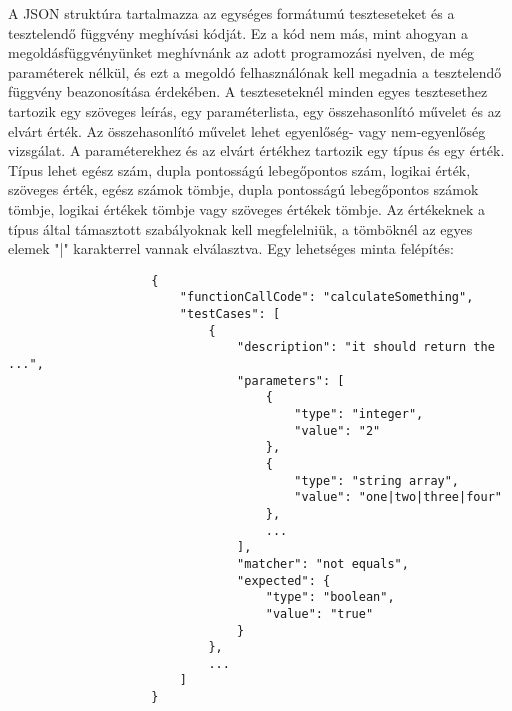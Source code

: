 \documentclass{elteikthesis}
\begin{document}
				A JSON struktúra tartalmazza az egységes formátumú teszteseteket és a tesztelendő függvény meghívási kódját. Ez a kód nem más, mint ahogyan a megoldásfüggvényünket meghívnánk az adott programozási nyelven, de még paraméterek nélkül, és ezt a megoldó felhasználónak kell megadnia a tesztelendő függvény beazonosítása érdekében. A teszteseteknél minden egyes tesztesethez tartozik egy szöveges leírás, egy paraméterlista, egy összehasonlító művelet és az elvárt érték. Az összehasonlító művelet lehet egyenlőség- vagy nem-egyenlőség vizsgálat. A paraméterekhez és az elvárt értékhez tartozik egy típus és egy érték. Típus lehet egész szám, dupla pontosságú lebegőpontos szám, logikai érték, szöveges érték, egész számok tömbje, dupla pontosságú lebegőpontos számok tömbje, logikai értékek tömbje vagy szöveges értékek tömbje. Az értékeknek a típus által támasztott szabályoknak kell megfelelniük, a tömböknél az egyes elemek "|" karakterrel vannak elválasztva. Egy lehetséges minta felépítés:
				\begin{verbatim}
					{
						"functionCallCode": "calculateSomething",
						"testCases": [
							{
								"description": "it should return the ...",
								"parameters": [
									{
										"type": "integer",
										"value": "2"
									},
									{
										"type": "string array",
										"value": "one|two|three|four"
									},
									...
								],
								"matcher": "not equals",
								"expected": {
									"type": "boolean",
									"value": "true"
								}
							},
							...
						]
					}
				\end{verbatim}
\end{document}
